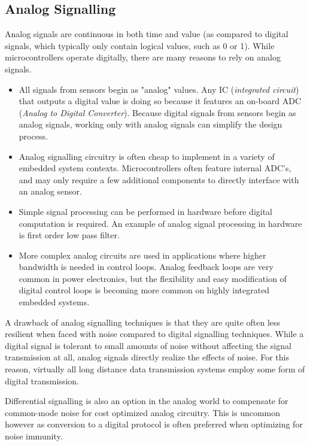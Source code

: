 \documentclass[main.tex]{subfiles}
\begin{document}
\subsection{Analog Signalling}
Analog signals are continuous in both time and value (as compared to digital signals, which typically only contain logical values, such as 0 or 1). While microcontrollers operate digitally, there are many reasons to rely on analog signals.
\begin{itemize}
    \item All signals from sensors begin as "analog" values. Any IC (\textit{integrated circuit}) that outputs a digital value is doing so because it features an on-board ADC (\textit{Analog to Digital Converter}). Because digital signals from sensors begin as analog signals, working only with analog signals can simplify the design process.
    \item Analog signalling circuitry is often cheap to implement in a variety of embedded system contexts. Microcontrollers often feature internal ADC's, and may only require a few additional components to directly interface with an analog sensor.
    \item Simple signal processing can be performed in hardware before digital computation is required. An example of analog signal processing in hardware is first order low pass filter. 
    \item More complex analog circuits are used in applications where higher bandwidth is needed in control loops. Analog feedback loops are very common in power electronics, but the flexibility and easy modification of digital control loops is becoming more common on highly integrated embedded systems.
\end{itemize}

\noindent A drawback of analog signalling techniques is that they are quite often less resilient when faced with noise compared to digital signalling techniques. While a digital signal is tolerant to small amounts of noise without affecting the signal transmission at all, analog signals directly realize the effects of noise. For this reason, virtually all long distance data transmission systems employ some form of digital transmission. \newline

\newnoindentpara Differential signalling is also an option in the analog world to compensate for common-mode noise for cost optimized analog circuitry. This is uncommon however as conversion to a digital protocol is often preferred when optimizing for noise immunity. 
\end{document}

